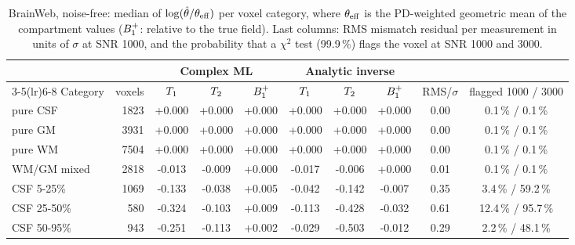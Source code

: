 \begin{table}[!htbp]
\centering
\caption{BrainWeb, noise-free: median of $\log(\hat\theta/\theta_{\rm eff})$ per voxel category, where $\theta_{\rm eff}$ is the PD-weighted geometric mean of the compartment values ($B_1^{+}$: relative to the true field). Last columns: RMS mismatch residual per measurement in units of $\sigma$ at SNR 1000, and the probability that a $\chi^2$ test (99.9\,\%) flags the voxel at SNR 1000 and 3000.}
\label{tab:bwclean}
\footnotesize
\setlength{\tabcolsep}{3pt}
\begin{tabular}{lrcccccccc}
\toprule
 & & \multicolumn{3}{c}{Complex ML} & \multicolumn{3}{c}{Analytic inverse} & & \\
\cmidrule(lr){3-5}\cmidrule(lr){6-8}
Category & voxels & $T_1$ & $T_2$ & $B_1^{+}$ & $T_1$ & $T_2$ & $B_1^{+}$ & RMS/$\sigma$ & flagged 1000 / 3000\\
\midrule
pure CSF & 1823 & +0.000 & +0.000 & +0.000 & +0.000 & +0.000 & +0.000 & 0.00 & 0.1\,\% / 0.1\,\%\\
pure GM & 3931 & +0.000 & +0.000 & +0.000 & +0.000 & +0.000 & +0.000 & 0.00 & 0.1\,\% / 0.1\,\%\\
pure WM & 7504 & +0.000 & +0.000 & +0.000 & +0.000 & +0.000 & +0.000 & 0.00 & 0.1\,\% / 0.1\,\%\\
WM/GM mixed & 2818 & -0.013 & -0.009 & +0.000 & -0.017 & -0.006 & +0.000 & 0.01 & 0.1\,\% / 0.1\,\%\\
CSF 5-25\% & 1069 & -0.133 & -0.038 & +0.005 & -0.042 & -0.142 & -0.007 & 0.35 & 3.4\,\% / 59.2\,\%\\
CSF 25-50\% & 580 & -0.324 & -0.103 & +0.009 & -0.113 & -0.428 & -0.032 & 0.61 & 12.4\,\% / 95.7\,\%\\
CSF 50-95\% & 943 & -0.251 & -0.113 & +0.002 & -0.029 & -0.503 & -0.012 & 0.29 & 2.2\,\% / 48.1\,\%\\
\bottomrule
\end{tabular}
\end{table}

